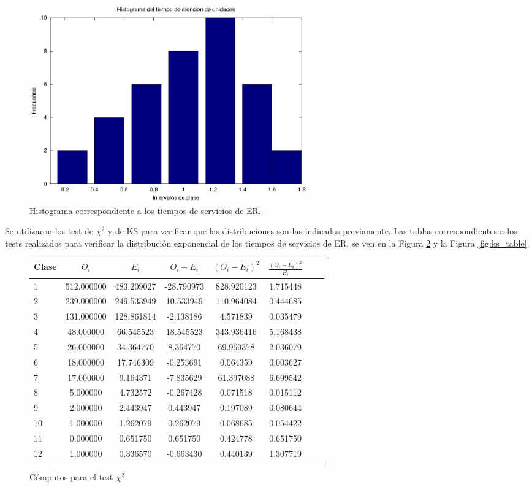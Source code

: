 \documentclass[a4paper,10pt]{article}
\begin{document}
\begin{figure}[h]
\begin{center}
\includegraphics[width=12cm]{../src/parteA/hist_servicios.eps}
\caption{\label{fig:hist_servicios} Histograma correspondiente a los tiempos de servicios de ER.}
\end{center}
\end{figure}

Se utilizaron los test de  $\chi^2$ y de KS para verificar que las distribuciones son las indicadas previamente. Las tablas correspondientes a los tests realizados para verificar la distribución exponencial de los tiempos de servicios de ER, se ven en la Figura \ref{tab:chi_table} y la Figura \ref{fig:ks_table}

\begin{figure}[h]
\begin{center}
\begin{tabular}{l*{6}{c}r}
\hline
Clase& $O_i$ & $E_i$  & $O_i - E_i$ & $(O_i - E_i)^2$ & $\frac{(O_i - E_i)^2}{E_i}$\\
\hline
1&512.000000&483.209027&-28.790973&828.920123&1.715448\\
2&239.000000&249.533949&10.533949&110.964084&0.444685\\
3&131.000000&128.861814&-2.138186&4.571839&0.035479\\
4&48.000000&66.545523&18.545523&343.936416&5.168438\\
5&26.000000&34.364770&8.364770&69.969378&2.036079\\
6&18.000000&17.746309&-0.253691&0.064359&0.003627\\
7&17.000000&9.164371&-7.835629&61.397088&6.699542\\
8&5.000000&4.732572&-0.267428&0.071518&0.015112\\
9&2.000000&2.443947&0.443947&0.197089&0.080644\\
10&1.000000&1.262079&0.262079&0.068685&0.054422\\
11&0.000000&0.651750&0.651750&0.424778&0.651750\\
12&1.000000&0.336570&-0.663430&0.440139&1.307719\\
\hline
\end{tabular}
\caption{\label{tab:chi_table} Cómputos para el test $\chi^2$.}
\end{center}
\end{figure}
\end{document}
